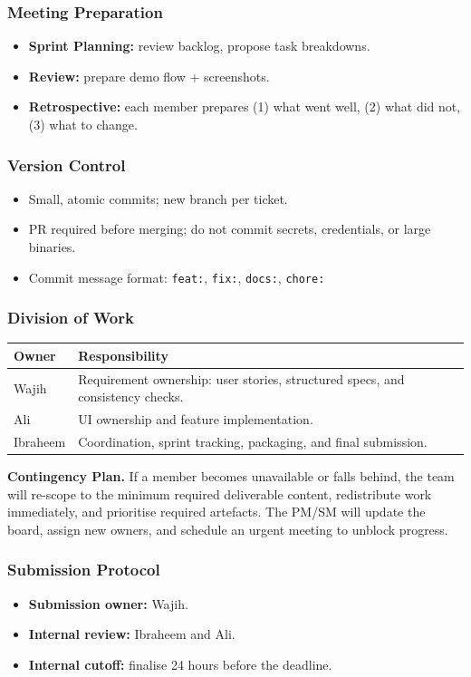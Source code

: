 \documentclass[11pt, legalpaper]{article}
\begin{document}
\subsubsection*{Meeting Preparation}
\begin{itemize}
  \item \textbf{Sprint Planning:} review backlog, propose task breakdowns.
  \item \textbf{Review:} prepare demo flow + screenshots.
  \item \textbf{Retrospective:} each member prepares (1) what went well,
        (2) what did not, (3) what to change.
\end{itemize}

\subsubsection*{Version Control}
\begin{itemize}
  \item Small, atomic commits; new branch per ticket.
  \item PR required before merging; do not commit secrets, credentials, or large binaries.
  \item Commit message format: \texttt{feat:}, \texttt{fix:}, \texttt{docs:}, \texttt{chore:}
\end{itemize}

\subsubsection*{Division of Work}
\begin{tabularx}{\linewidth}{l X}
  \toprule
  \textbf{Owner} & \textbf{Responsibility} \\
  \midrule
  Wajih     & Requirement ownership: user stories, structured specs, and consistency checks. \\[2pt]
  Ali       & UI ownership and feature implementation. \\[2pt]
  Ibraheem  & Coordination, sprint tracking, packaging, and final submission. \\
  \bottomrule
\end{tabularx}

\medskip
\noindent\textbf{Contingency Plan.}
If a member becomes unavailable or falls behind, the team will re-scope to the
minimum required deliverable content, redistribute work immediately, and
prioritise required artefacts. The PM/SM will update the board, assign new owners,
and schedule an urgent meeting to unblock progress.

\subsubsection*{Submission Protocol}
\begin{itemize}
  \item \textbf{Submission owner:} Wajih.
  \item \textbf{Internal review:} Ibraheem and Ali.
  \item \textbf{Internal cutoff:} finalise 24 hours before the deadline.
\end{itemize}
\end{document}
